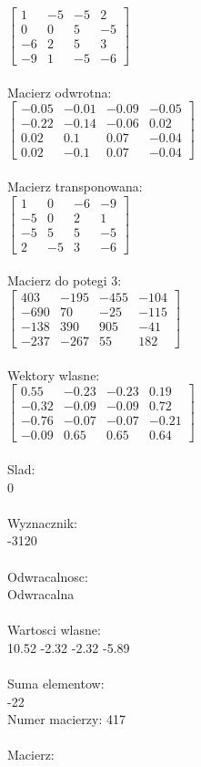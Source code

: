 \documentclass[a4paper,12pt]{article}
\begin{document}
$\begin{bmatrix} 1&-5&-5&2\\0&0&5&-5\\-6&2&5&3\\-9&1&-5&-6 \end{bmatrix}$
\\
\\
Macierz odwrotna:\\

$\begin{bmatrix} -0.05&-0.01&-0.09&-0.05\\-0.22&-0.14&-0.06&0.02\\0.02&0.1&0.07&-0.04\\0.02&-0.1&0.07&-0.04 \end{bmatrix}$
\\
\\
Macierz transponowana:\\

$\begin{bmatrix} 1&0&-6&-9\\-5&0&2&1\\-5&5&5&-5\\2&-5&3&-6 \end{bmatrix}$
\\
\\
Macierz do potegi 3:\\

$\begin{bmatrix} 403&-195&-455&-104\\-690&70&-25&-115\\-138&390&905&-41\\-237&-267&55&182 \end{bmatrix}$
\\
\\
Wektory wlasne:\\

$\begin{bmatrix} 0.55&-0.23&-0.23&0.19\\-0.32&-0.09&-0.09&0.72\\-0.76&-0.07&-0.07&-0.21\\-0.09&0.65&0.65&0.64 \end{bmatrix}$
\\
\\
Slad:\\
0
\\
\\
Wyznacznik:\\
-3120
\\
\\
Odwracalnosc:\\
Odwracalna
\\
\\
Wartosci wlasne:\\
10.52 -2.32 -2.32 -5.89
\\
\\
Suma elementow:\\
-22
\\
\newpage
Numer macierzy:
417
\\
\\
Macierz:\\
\end{document}
